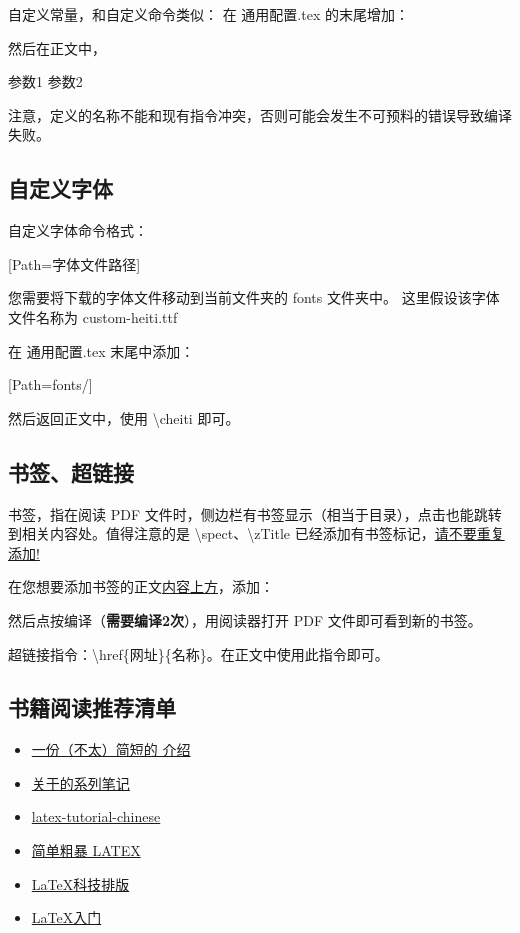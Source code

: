 \documentclass[a4paper,12pt]{ctexart}
\newenvironment{ul}{
	\begin{itemize}[topsep=0pt,labelsep=.5em,leftmargin=4.5em,itemsep=-.5em]
	}{\end{itemize}}
\newcommand{\emp}[1]{
	\colorbox{spanbg}{#1}
}
\begin{document}
	自定义常量，和自定义命令类似：
	在\emp{通用配置.tex} 的末尾增加：
	\begin{latexcode}
		\def\常量名称1{内容}
		\def\常量名称2#1#2{
			这是参数 #1， %
			还有这个 #2。 %
		}
	\end{latexcode}
	然后在正文中，
	\begin{latexcode}
		 参数1 {参数2}
	\end{latexcode}
	注意，定义的名称不能和现有指令冲突，否则可能会发生不可预料的错误导致编译失败。
	
	\subsection{自定义字体}
	自定义字体命令格式：
	\begin{latexcode}
	[Path=字体文件路径]
	\end{latexcode}

	您需要将下载的字体文件移动到当前文件夹的\emp{fonts}文件夹中。
	这里假设该字体文件名称为\emp{custom-heiti.ttf}

	在\emp{通用配置.tex}末尾中添加：
	\begin{latexcode}
	[Path=fonts/]
	\end{latexcode}
	然后返回正文中，使用 \textbackslash cheiti 即可。
	
	\subsection{书签、超链接}
	书签，指在阅读 PDF 文件时，侧边栏有书签显示（相当于目录），点击也能跳转到相关内容处。值得注意的是 \textbackslash spect、\textbackslash zTitle 已经添加有书签标记，\underline{请不要重复添加!}
	
	在您想要添加书签的正文\underline{内容上方}，添加：
	\begin{latexcode}
		\tagBookmark{书签名}
	\end{latexcode}
	然后点按编译（\textbf{需要编译2次}），用阅读器打开 PDF 文件即可看到新的书签。
	
	超链接指令：\textbackslash href\{网址\}\{名称\}。在正文中使用此指令即可。
	
	\subsection{书籍阅读推荐清单}
	\begin{ul}
		\item \href{https://texdoc.org/serve/lshort-zh-cn.pdf/0}{一份（不太）简短的 \LaTeXe 介绍}
		\item \href{https://github.com/huangxg/lnotes.git}{关于\LaTeXe 的系列笔记}
		\item \href{https://zilutian.github.io/latex-tutorial-chinese/}{latex-tutorial-chinese}
		\item \href{https://github.com/wklchris/Note-by-LaTeX}{简单粗暴 LATEX}
		\item \href{https://math.ecnu.edu.cn/~jypan/Latex/index.html}{\LaTeX 科技排版}
		\item \href{https://lrita.github.io/images/wiki/latex入门-简版-刘海洋.pdf}{\LaTeX 入门}
	\end{ul}
\end{document}
